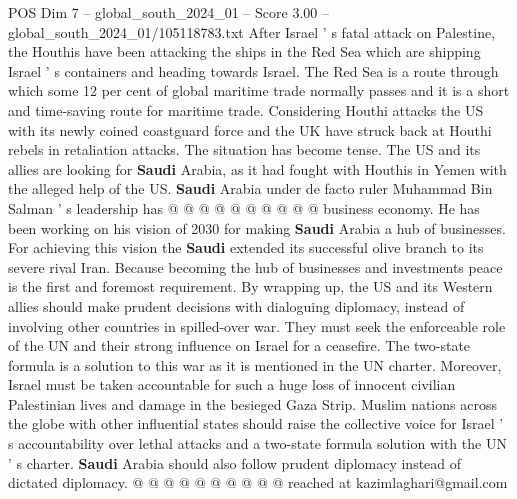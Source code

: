 \begin{textsample}{POS Dim 7 – global\_south\_2024\_01 – Score 3.00 – global\_south\_2024\_01/105118783.txt}
After Israel ' s fatal attack on Palestine, the Houthis have been attacking the ships in the Red Sea which are shipping Israel ' s containers and heading towards Israel.
The Red Sea is a route through which some 12 per cent of global maritime trade normally passes and it is a short and time-saving route for maritime trade.
Considering Houthi attacks the US with its newly coined coastguard force and the UK have struck back at Houthi rebels in retaliation attacks.
The situation has become tense.
The US and its allies are looking for \textbf{Saudi} Arabia, as it had fought with Houthis in Yemen with the alleged help of the US. \textbf{Saudi} Arabia under de facto ruler Muhammad Bin Salman ' s leadership has @ @ @ @ @ @ @ @ @ @ business economy.
He has been working on his vision of 2030 for making \textbf{Saudi} Arabia a hub of businesses.
For achieving this vision the \textbf{Saudi} extended its successful olive branch to its severe rival Iran.
Because becoming the hub of businesses and investments peace is the first and foremost requirement.
By wrapping up, the US and its Western allies should make prudent decisions with dialoguing diplomacy, instead of involving other countries in spilled-over war.
They must seek the enforceable role of the UN and their strong influence on Israel for a ceasefire.
The two-state formula is a solution to this war as it is mentioned in the UN charter.
Moreover, Israel must be taken accountable for such a huge loss of innocent civilian Palestinian lives and damage in the besieged Gaza Strip.
Muslim nations across the globe with other influential states should raise the collective voice for Israel ' s accountability over lethal attacks and a two-state formula solution with the UN ' s charter. \textbf{Saudi} Arabia should also follow prudent diplomacy instead of dictated diplomacy. @ @ @ @ @ @ @ @ @ @ reached at kazimlaghari@gmail.com

\end{textsample}
